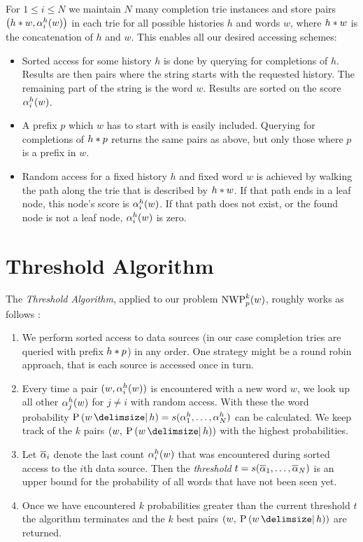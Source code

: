 For $1 \leq i \leq N$ we maintain $N$ many completion trie instances and store
pairs $\left(h * w, \alpha^h_i(w)\right)$ in each trie for all possible
histories $h$ and words $w$, where $h * w$ is the concatenation of
$h$ and $w$.
This enables all our desired accessing schemes:
\begin{itemize}
  \item Sorted access for some history $h$ is done by querying for completions
    of $h$.
    Results are then pairs where the string starts with the requested
    history.
    The remaining part of the string is the word $w$.
    Results are sorted on the score $\alpha^h_i(w)$.
  \item A prefix $p$ which $w$ has to start with is easily included.
    Querying for completions of $h * p$ returns the same pairs as above, but only
    those where $p$ is a prefix in $w$.
  \item Random access for a fixed history $h$ and fixed word $w$ is achieved by
    walking the path along the trie that is described by $h * w$.
    If that path ends in a leaf node, this node's score is $\alpha^h_i(w)$.
    If that path does not exist, or the found node is not a leaf node,
    $\alpha^h_i(w)$ is zero.
\end{itemize}

\section{Threshold Algorithm}
\label{sec:thresholdalgorithm}

The \emph{Threshold Algorithm}, applied to our problem $\NWP[p][k](w)$, roughly
works as follows \parencite{Fagin2001}:
\begin{enumerate}
  \item We perform sorted access to data sources (in our case completion tries
    are queried with prefix $h * p$) in any order.
    One strategy might be a round robin approach, that is each source is
    accessed once in turn.
  \item Every time a pair $(w, \alpha^h_i(w))$ is encountered with a new word
    $w$, we look up all other $\alpha^h_j(w)$ for $j \neq i$ with random
    access.
    With these the word probability
    $\Prob{w}{h} = s(\SumArg^h_1, \ldots, \SumArg^h_N)$ can be calculated.
    We keep track of the $k$ pairs $(w, \: \Prob{w}{h})$ with the highest
    probabilities.
  \item Let $\overline{\alpha}_i$ denote the last count $\alpha^h_i(w)$ that
    was encountered during sorted access to the $i$th data source.
    Then the \emph{threshold}
    $t = s(\overline{\alpha}_1, \ldots, \overline{\alpha}_N)$
    is an upper bound for the probability of all words that have not been
    seen yet.
  \item Once we have encountered $k$ probabilities greater than the current
    threshold $t$ the algorithm terminates and the $k$ best pairs
    $(w, \: \Prob{w}{h})$ are returned.
\end{enumerate}

